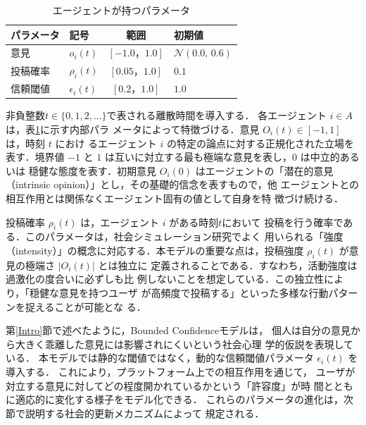 \documentclass[a4j]{ujarticle}
\def\post{\rho} %
\def\BoundedConfidence{\epsilon}
\begin{document}
  
\begin{table}[t]
  \tabcolsep=5pt
  \centering
  \caption{エージェントが持つパラメータ}\label{tab:agentparameters}
  \begin{tabular}{llcl}
    \toprule
    パラメータ & 記号 & 範囲 & 初期値 \\
    \midrule
    意見 & $o_i(t)$ & $[-1.0，1.0]$ & $\mathcal{N}(0.0,\,0.6)$ \\
    投稿確率 & $\post_i(t)$ & $[0.05，1.0]$ & $0.1$ \\
    信頼閾値 & $\BoundedConfidence_i(t)$ & $[0.2，1.0]$ & $1.0$\\
    \bottomrule
  \end{tabular}
\end{table}

非負整数$t \in \{0,1,2,\ldots\}$で表される離散時間を導入する．
各エージェント $i \in A$ は，表\ref{tab:agentparameters}に示す内部パラ
メータによって特徴づける．意見 $O_i(t) \in [-1,1]$ は，時刻 $t$ におけ
るエージェント $i$ の特定の論点に対する正規化された立場を表す．境界値
$-1$ と $1$ は互いに対立する最も極端な意見を表し，$0$ は中立的あるいは
穏健な態度を表す．初期意見 $O_i(0)$ はエージェントの「潜在的意見
（intrinsic opinion）」とし，その基礎的信念を表すもので，他
エージェントとの相互作用とは関係なくエージェント固有の値として自身を特
徴づけ続ける．
\par


投稿確率 $\post_i(t)$ は，エージェント $i$ がある時刻$t$において
投稿を行う確率である．このパラメータは，社会シミュレーション研究でよく
用いられる「強度（intensity）」の概念に対応する．本モデルの重要な点は，投稿強度 $\post_i(t)$ が意見の極端さ $|O_i(t)|$ とは独立に
定義されることである．すなわち，活動強度は過激化の度合いに必ずしも比
例しないことを想定している．この独立性により，「穏健な意見を持つユーザ
が高頻度で投稿する」といった多様な行動パターンを捉えることが可能とな
る．
\par


第\ref{Intro}節で述べたように，Bounded Confidenceモデルは，
個人は自分の意見から大きく乖離した意見には影響されにくいという社会心理
学的仮説を表現している．
本モデルでは静的な閾値ではなく，動的な信頼閾値パラメータ
$\BoundedConfidence_i(t)$ を導入する．
これにより，プラットフォーム上での相互作用を通じて，
ユーザが対立する意見に対してどの程度開かれているかという「許容度」が時
間とともに適応的に変化する様子をモデル化できる．
これらのパラメータの進化は，次節で説明する社会的更新メカニズムによって
規定される．
\par
\end{document}
